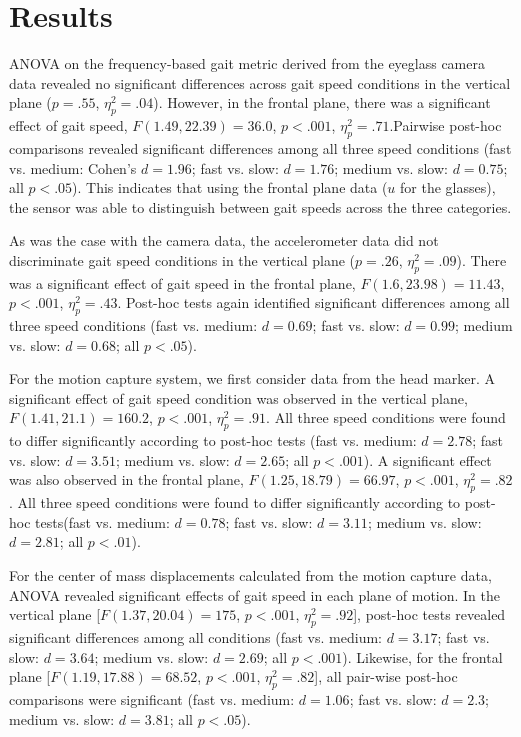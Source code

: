 \documentclass[12pt]{report}
\begin{document}
\section{Results}
ANOVA on the frequency-based gait metric derived from the eyeglass camera data revealed no significant differences across gait speed conditions in the vertical plane ($p= .55$, $\eta^2_p = .04$). However, in the frontal plane, there was a significant effect of gait speed, $F(1.49, 22.39) = 36.0$, $p < .001$, $\eta^2_p = .71$.Pairwise post-hoc comparisons revealed significant differences among all three speed conditions (fast vs. medium: Cohen's $d= 1.96$; fast vs. slow: $d= 1.76$; medium vs. slow: $d= 0.75$; all $p< .05$). This indicates that using the frontal plane data ($u$ for the glasses), the sensor was able to distinguish between gait speeds across the three categories. 
 
As was the case with the camera data, the accelerometer data did not discriminate gait speed conditions in the vertical plane ($p= .26$, $\eta^2_p = .09$). There was a significant effect of gait speed in the frontal plane, $F(1.6, 23.98) = 11.43$, $p < .001$, $\eta^2_p = .43$. Post-hoc tests again identified significant differences among all three speed conditions (fast vs. medium: $d = 0.69$; fast vs. slow: $d= 0.99$; medium vs. slow: $d= 0.68$; all $p < .05$).
 
For the motion capture system, we first consider data from the head marker. A significant effect of gait speed condition was observed in the vertical plane, $F(1.41, 21.1) = 160.2$, $p < .001$, $\eta^2_p = .91$. All three speed conditions were found to differ significantly according to post-hoc tests (fast vs. medium: $d= 2.78$; fast vs. slow: $d= 3.51$; medium vs. slow: $d= 2.65$; all $p< .001$). A significant effect was also observed in the frontal plane, $F(1.25, 18.79) = 66.97$, $p < .001$, $\eta^2_p = .82$. All three speed conditions were found to differ significantly according to post-hoc tests(fast vs. medium: $d= 0.78$; fast vs. slow: $d= 3.11$; medium vs. slow: $d= 2.81$; all $p< .01$).
 
For the center of mass displacements calculated from the motion capture data, ANOVA revealed significant effects of gait speed in each plane of motion. In the vertical plane [$F(1.37,20.04) = 175$, $p < .001$, $\eta^2_p = .92$], post-hoc tests revealed significant differences among all conditions (fast vs. medium: $d= 3.17$; fast vs. slow: $d= 3.64$; medium vs. slow: $d= 2.69$; all $p< .001$). Likewise, for the frontal plane [$F(1.19,17.88) = 68.52$, $p< .001$, $\eta^2_p = .82$], all pair-wise post-hoc comparisons were significant (fast vs. medium: $d= 1.06$; fast vs. slow: $d= 2.3$; medium vs. slow: $d= 3.81$; all $p< .05$).
\end{document}
